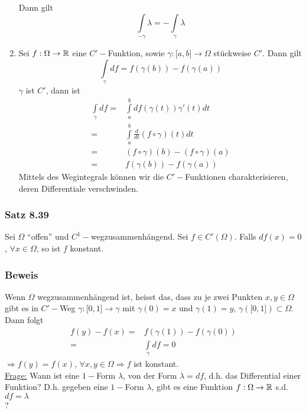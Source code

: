 \begin{enumerate}[\indent E1)]
Dann gilt \[\int\limits_{ - \gamma } \lambda   =  - \int\limits_\gamma  \lambda  \]
\item Sei $f:\Omega\to\mathbb{R}$ eine $C'-$Funktion, sowie $\gamma:\lbrack a,b\rbrack\to\Omega$ stückweise $C'$. Dann gilt \[\int\limits_\gamma  {df}  = f\left( {\gamma \left( b \right)} \right) - f\left( {\gamma \left( a \right)} \right)\]
$\gamma$ ist $C'$, dann ist
\begin{align*}
\int\limits_\gamma  {df}  = & \int\limits_a^b {df\left( {\gamma \left( t \right)} \right)\gamma '\left( t \right)dt} \\
\mathop  = & \int\limits_a^b {\frac{d}{{dt}}\left( {f \circ \gamma } \right)\left( t \right)dt}\\
 = &\left( {f \circ \gamma } \right)\left( b \right) - \left( {f \circ \gamma } \right)\left( a \right)\\
 = & f\left( {\gamma \left( b \right)} \right) - f\left( {\gamma \left( a \right)} \right)
\end{align*}
Mittels des Wegintegrals können wir die $C'-$Funktionen charakterisieren, deren Differentiale verschwinden.
\end{enumerate}

\subsubsection*{Satz 8.39}
Sei $\Omega$ ``offen'' und $C^1-$wegzusammenhängend. Sei $f\in C'\left(\Omega\right)$. Falls $df(x)=0$, $\forall x\in\Omega$, so ist $f$ konstant.
\subsubsection*{Beweis}
Wenn $\Omega$ wegzusammenhängend ist, heisst das, dass zu je zwei Punkten $x,y\in\Omega$ gibt es in $C'-$Weg $\gamma :\lbrack 0,1\rbrack\to\gamma$ mit $\gamma(0)=x$ und $\gamma(1)=y$, $\gamma\left(\lbrack 0,1\rbrack\right)\subset\Omega$. Dann folgt
\begin{align*}
f(y)-f(x)=& f\left(\gamma(1)\right)-f\left(\gamma(0)\right)\\
= &\int\limits_{\gamma} df = 0
\end{align*}
$\Rightarrow f(y)=f(x)$, $\forall x,y\in\Omega\Rightarrow f$ ist konstant.\\

\noindent\underline{Frage:} Wann ist eine $1-$Form $\lambda$, von der Form $\lambda = df$, d.h. das Differential einer Funktion? D.h. gegeben eine $1-$Form $\lambda$, gibt es eine Funktion $f:\Omega\to\mathbb{R}$ s.d. $df=\lambda$\\?

